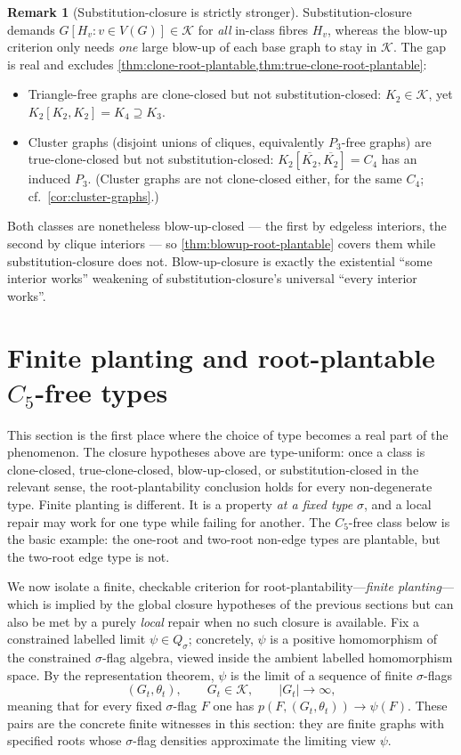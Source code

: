 \documentclass[11pt]{article}
\theoremstyle{definition}
\newtheorem{remark}[remark]{Remark}
\newcommand{\K}{\mathcal{K}}
\begin{document}
\begin{remark}[Substitution-closure is strictly stronger]\label{rem:strictness}
Substitution-closure demands $G[H_v:v\in V(G)]\in\K$ for \emph{all} in-class fibres $H_v$,
whereas the blow-up criterion only needs \emph{one} large blow-up of each base graph to stay in
$\K$.  The gap is real and excludes \cref{thm:clone-root-plantable,thm:true-clone-root-plantable}:
\begin{itemize}
\item Triangle-free graphs are clone-closed but not substitution-closed: $K_2\in\K$, yet
  $K_2[K_2,K_2]=K_4\supseteq K_3$.
\item Cluster graphs (disjoint unions of cliques, equivalently $P_3$-free graphs) are
  true-clone-closed but not substitution-closed: $K_2[\overline{K_2},\overline{K_2}]=C_4$
  has an induced $P_3$.  (Cluster graphs are not clone-closed either, for the same $C_4$;
  cf.\ \cref{cor:cluster-graphs}.)
\end{itemize}
Both classes are nonetheless blow-up-closed --- the first by edgeless interiors, the second
by clique interiors --- so \cref{thm:blowup-root-plantable} covers them while
substitution-closure does not.  Blow-up-closure is exactly the existential ``some
interior works'' weakening of substitution-closure's universal ``every interior works''.
\end{remark}

\section{Finite planting and root-plantable \texorpdfstring{$C_5$}{C5}-free types}

This section is the first place where the choice of type becomes a real part of the
phenomenon.  The closure hypotheses above are type-uniform: once a class is clone-closed,
true-clone-closed, blow-up-closed, or substitution-closed in the relevant sense, the
root-plantability conclusion holds for every non-degenerate type.  Finite planting is
different.  It is a property \emph{at a fixed type} $\sigma$, and a local repair may work
for one type while failing for another.  The $C_5$-free class below is the basic example:
the one-root and two-root non-edge types are plantable, but the two-root edge type is not.

We now isolate a finite, checkable criterion for root-plantability---\emph{finite
planting}---which is implied by the global closure hypotheses of the previous sections but
can also be met by a purely \emph{local} repair when no such closure is available.  Fix a
constrained
labelled limit $\psi\in Q_\sigma$; concretely, $\psi$ is a positive homomorphism of the
constrained $\sigma$-flag algebra, viewed inside the ambient labelled homomorphism space.
By the representation theorem, $\psi$ is the limit of a sequence of finite
$\sigma$-flags
\[
  (G_t,\theta_t),\qquad G_t\in\K,\qquad |G_t|\to\infty,
\]
meaning that for every fixed $\sigma$-flag $F$ one has
$p(F,(G_t,\theta_t))\to\psi(F)$.  These pairs are the concrete finite witnesses in
this section: they are finite graphs with specified roots whose $\sigma$-flag densities approximate the
limiting view $\psi$.
\end{document}
